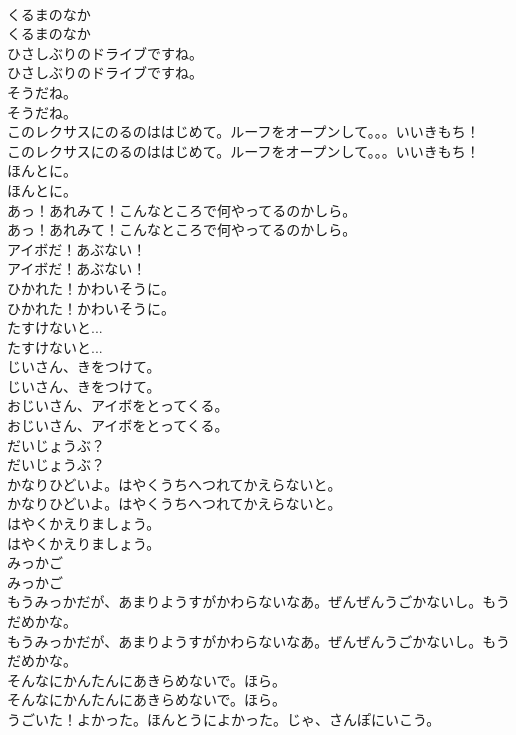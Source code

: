 \documentclass[8pt]{extreport}
\begin{document}
\begin{CJK}{UTF8}{min}
\\	くるまのなか
\\	くるまのなか
\\	ひさしぶりのドライブですね。
\\	ひさしぶりのドライブですね。
\\	そうだね。
\\	そうだね。
\\	このレクサスにのるのははじめて。ルーフをオープンして。。。いいきもち！
\\	このレクサスにのるのははじめて。ルーフをオープンして。。。いいきもち！
\\	ほんとに。
\\	ほんとに。
\\	あっ！あれみて！こんなところで何やってるのかしら。
\\	あっ！あれみて！こんなところで何やってるのかしら。
\\	アイボだ！あぶない！
\\	アイボだ！あぶない！
\\	ひかれた！かわいそうに。
\\	ひかれた！かわいそうに。
\\	たすけないと...
\\	たすけないと...
\\	じいさん、きをつけて。
\\	じいさん、きをつけて。
\\	おじいさん、アイボをとってくる。
\\	おじいさん、アイボをとってくる。
\\	だいじょうぶ？
\\	だいじょうぶ？
\\	かなりひどいよ。はやくうちへつれてかえらないと。
\\	かなりひどいよ。はやくうちへつれてかえらないと。
\\	はやくかえりましょう。
\\	はやくかえりましょう。
\\	みっかご
\\	みっかご
\\	もうみっかだが、あまりようすがかわらないなあ。ぜんぜんうごかないし。もうだめかな。
\\	もうみっかだが、あまりようすがかわらないなあ。ぜんぜんうごかないし。もうだめかな。
\\	そんなにかんたんにあきらめないで。ほら。
\\	そんなにかんたんにあきらめないで。ほら。
\\	うごいた！よかった。ほんとうによかった。じゃ、さんぽにいこう。

\end{CJK}
\end{document}
